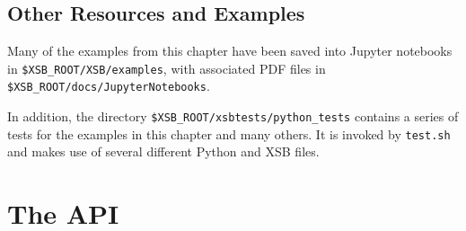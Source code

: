 \subsection{Other \px{} Resources and Examples}

Many of the examples from this chapter have been saved into Jupyter
notebooks in {\tt \$XSB\_ROOT/XSB/examples}, with associated PDF files in
{\tt \$XSB\_ROOT/docs/JupyterNotebooks}.

In addition, the directory {\tt \$XSB\_ROOT/xsbtests/python\_tests}
contains a series of tests for the examples in this chapter and many
others.  It is invoked by {\tt test.sh} and makes use of several
different Python and XSB files.

\section{The \px{} API}

